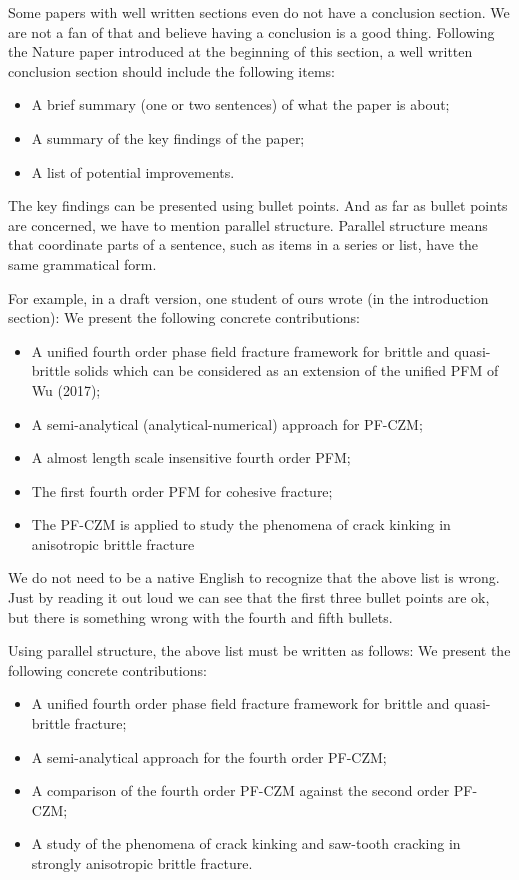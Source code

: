 \documentclass[authoryear,12pta4paper,fleqn]{article}
\numberwithin{equation}{section}
\theoremstyle{remark}
\begin{document}
Some papers with well written sections even do not have a conclusion section. We are not a fan of that and believe having a conclusion is a good thing. Following the Nature paper introduced at the beginning of this section, a well written conclusion section should include the following items:

\begin{itemize}
\item A brief summary (one or two sentences) of what the paper is about;
\item A summary of the key findings of the paper;
\item A list of potential improvements.
\end{itemize}
The key findings can be presented using bullet points. And as far as bullet points are concerned, we have to mention parallel structure. Parallel structure means that coordinate parts of a sentence, such as items in a series or list, have the same grammatical form. 

For example, in a draft version, one student of ours wrote (in the introduction section): We present the following concrete contributions:
\begin{itemize}
	\item A unified fourth order phase field fracture framework for brittle and quasi-brittle solids which can be considered as an extension of the unified PFM of Wu (2017);
	\item A semi-analytical (analytical-numerical) approach for PF-CZM;
\item A almost length scale insensitive fourth order PFM;
\item The first fourth order PFM for cohesive fracture;
\item The PF-CZM is applied to study the phenomena of crack kinking in anisotropic brittle fracture
\end{itemize}
We do not need to be a native English to recognize that the above list is wrong. Just by reading it out loud we can see that the first three bullet points are ok, but there is something wrong with the fourth and fifth bullets.

Using parallel structure, the above list must be written as follows: We present the following concrete contributions:
\begin{itemize}
	\item A unified fourth order phase field fracture framework for brittle and quasi-brittle fracture;
\item A semi-analytical approach for the fourth order PF-CZM;
\item A comparison of the fourth order PF-CZM against the second order PF-CZM;
\item A study of the phenomena of crack kinking and saw-tooth cracking in strongly anisotropic brittle fracture.
\end{itemize}
\end{document}
